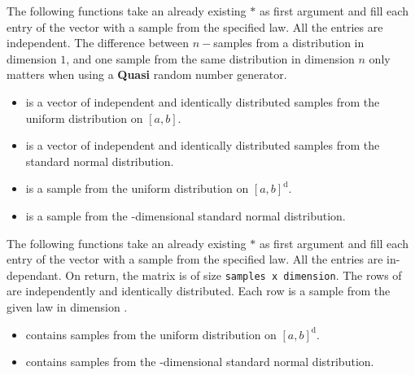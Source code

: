 The following functions take an already existing $\ast$ as
first argument and fill each entry of the vector with a sample from the
specified law. All the entries are independent. The difference between
$n-$samples from a distribution in dimension $1$, and one sample from the same
distribution in dimension $n$ only matters when using a {\bf Quasi} random
number generator.
\begin{itemize}
\item {}
  \sshortdescribe {} is a vector of independent and identically distributed
  samples from the uniform distribution on $[a, b]$.

\item {}
  \sshortdescribe {} is a vector of independent and identically distributed
  samples from the standard normal distribution.

\item {}
  \sshortdescribe {} is a sample from the uniform distribution on $[a, 
  b]^{\text{d}}$.

\item {}
  \sshortdescribe {} is a sample from the -dimensional
  standard normal distribution.

\end{itemize}

The following functions take an already existing $\ast$ as
first argument and fill each entry of the vector with a sample from the
specified law. All the entries are in-dependant. On return, the matrix 
is of size \verb!samples x dimension!. The rows of  are independently
and identically distributed. Each row is a sample from the given law in
dimension .
\begin{itemize}
\item {}
  \sshortdescribe {} contains  samples from the uniform
  distribution on $[a, b]^{\text{d}}$.

\item {}
  \sshortdescribe {} contains  samples from the
  -dimensional standard normal distribution.
\end{itemize}

